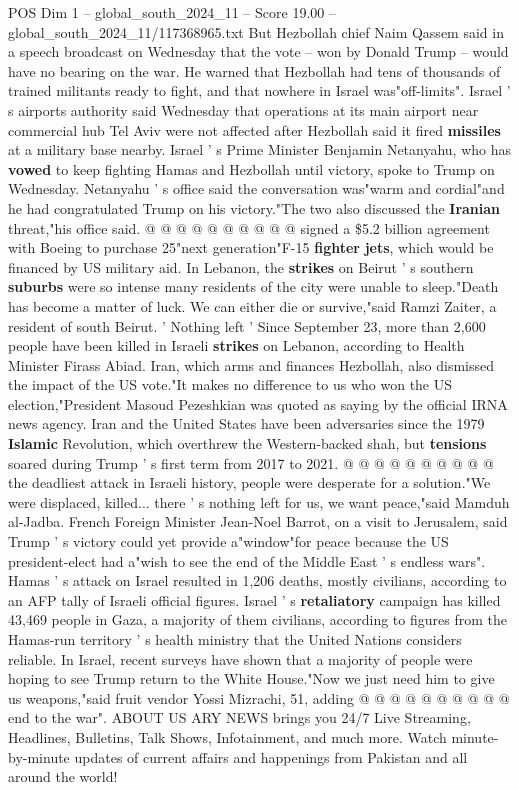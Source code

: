 \begin{textsample}{POS Dim 1 – global\_south\_2024\_11 – Score 19.00 – global\_south\_2024\_11/117368965.txt}
But Hezbollah chief Naim Qassem said in a speech broadcast on Wednesday that the vote -- won by Donald Trump -- would have no bearing on the war.
He warned that Hezbollah had tens of thousands of trained militants ready to fight, and that nowhere in Israel was"off-limits".
Israel ' s airports authority said Wednesday that operations at its main airport near commercial hub Tel Aviv were not affected after Hezbollah said it fired \textbf{missiles} at a military base nearby.
Israel ' s Prime Minister Benjamin Netanyahu, who has \textbf{vowed} to keep fighting Hamas and Hezbollah until victory, spoke to Trump on Wednesday.
Netanyahu ' s office said the conversation was"warm and cordial"and he had congratulated Trump on his victory."The two also discussed the \textbf{Iranian} threat,"his office said. @ @ @ @ @ @ @ @ @ @ signed a \$5.2 billion agreement with Boeing to purchase 25"next generation"F-15 \textbf{fighter} \textbf{jets}, which would be financed by US military aid.
In Lebanon, the \textbf{strikes} on Beirut ' s southern \textbf{suburbs} were so intense many residents of the city were unable to sleep."Death has become a matter of luck.
We can either die or survive,"said Ramzi Zaiter, a resident of south Beirut. ' Nothing left ' Since September 23, more than 2,600 people have been killed in Israeli \textbf{strikes} on Lebanon, according to Health Minister Firass Abiad.
Iran, which arms and finances Hezbollah, also dismissed the impact of the US vote."It makes no difference to us who won the US election,"President Masoud Pezeshkian was quoted as saying by the official IRNA news agency.
Iran and the United States have been adversaries since the 1979 \textbf{Islamic} Revolution, which overthrew the Western-backed shah, but \textbf{tensions} soared during Trump ' s first term from 2017 to 2021. @ @ @ @ @ @ @ @ @ @ the deadliest attack in Israeli history, people were desperate for a solution."We were displaced, killed... there ' s nothing left for us, we want peace,"said Mamduh al-Jadba.
French Foreign Minister Jean-Noel Barrot, on a visit to Jerusalem, said Trump ' s victory could yet provide a"window"for peace because the US president-elect had a"wish to see the end of the Middle East ' s endless wars".
Hamas ' s attack on Israel resulted in 1,206 deaths, mostly civilians, according to an AFP tally of Israeli official figures.
Israel ' s \textbf{retaliatory} campaign has killed 43,469 people in Gaza, a majority of them civilians, according to figures from the Hamas-run territory ' s health ministry that the United Nations considers reliable.
In Israel, recent surveys have shown that a majority of people were hoping to see Trump return to the White House."Now we just need him to give us weapons,"said fruit vendor Yossi Mizrachi, 51, adding @ @ @ @ @ @ @ @ @ @ end to the war".
ABOUT US ARY NEWS brings you 24/7 Live Streaming, Headlines, Bulletins, Talk Shows, Infotainment, and much more.
Watch minute-by-minute updates of current affairs and happenings from Pakistan and all around the world!

\end{textsample}
